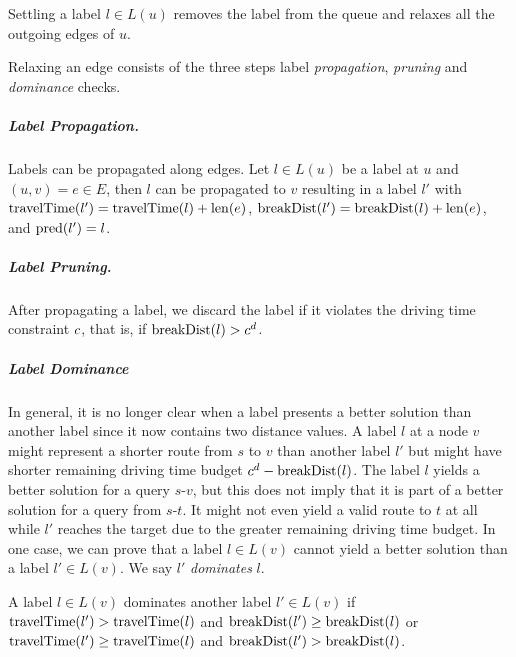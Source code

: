 \begin{algorithm}[hbtp]
	\DontPrintSemicolon


	\caption{\label{alg:settle_next_label}Settling a label $l \in L(u)$ removes the label from the queue and relaxes all the outgoing edges of $u$.}
\end{algorithm}


Relaxing an edge consists of the three steps label \emph{propagation}, \emph{pruning} and \emph{dominance} checks.

\subparagraph{Label Propagation.}
Labels can be propagated along edges. Let $l \in L(u)$ be a label at $u$ and $(u,v) = e \in E$, then $l$ can be propagated to $v$ resulting in a label $l'$ with $\operatorname{travelTime}(l') = \operatorname{travelTime}(l) + \operatorname{len}(e)$, $\operatorname{breakDist}(l') = \operatorname{breakDist}(l) + \operatorname{len}(e)$, and $\operatorname{pred}(l') = l$.

\subparagraph{Label Pruning.}
After propagating a label, we discard the label if it violates the driving time constraint $c$, that is, if $\operatorname{breakDist}(l) > c^d$.


\subparagraph{Label Dominance}
In general, it is no longer clear when a label presents a better solution than another label since it now contains two distance values. A label $l$ at a node $v$ might represent a shorter route from $s$ to $v$ than another label $l'$ but might have shorter remaining driving time budget $c^d - \operatorname{breakDist}(l)$. The label $l$ yields a better solution for a query $s$-$v$, but this does not imply that it is part of a better solution for a query from $s$-$t$. It might not even yield a valid route to $t$ at all while $l'$ reaches the target due to the greater remaining driving time budget. In one case, we can prove that a label $l \in L(v)$ cannot yield a better solution than a label $l' \in L(v)$. We say $l'$ \emph{dominates} $l$.

\begin{definition}
	A label $l \in L(v)$ dominates another label $l' \in L(v)$ if $\operatorname{travelTime}(l') > \operatorname{travelTime}(l)$ and $\operatorname{breakDist}(l') \ge \operatorname{breakDist}(l)$ or $\operatorname{travelTime}(l') \ge \operatorname{travelTime}(l)$ and $\operatorname{breakDist}(l') > \operatorname{breakDist}(l)$.
\end{definition}

